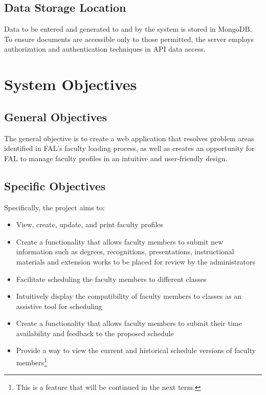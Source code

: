 \subsection{Data Storage Location}
Data to be entered and generated to and by the system is stored in MongoDB. To ensure documents are accessible only to those permitted, the server employs authorization and authentication techniques in API data access.

\section{System Objectives}

    \subsection{General Objectives}
    The general objective is to create a web application that resolves problem areas identified in FAL's faculty loading process, as well as creates an opportunity for FAL to manage faculty profiles in an intuitive and user-friendly design.
    
    \subsection{Specific Objectives}
    Specifically, the project aims to:
    
    \begin{itemize}
        \item View, create, update, and print faculty profiles
        \item Create a functionality that allows faculty members to submit new information such as degrees, recognitions, presentations, instructional materials and extension works to be placed for review by the administrators
        \item Facilitate scheduling the faculty members to different classes
        \item Intuitively display the compatibility of faculty members to classes as an assistive tool for scheduling
        \item Create a functionality that allows faculty members to submit their time availability and feedback to the proposed schedule
        \item Provide a way to view the current and historical schedule versions of faculty members\footnote{This is a feature that will be continued in the next term.}
    \end{itemize}

